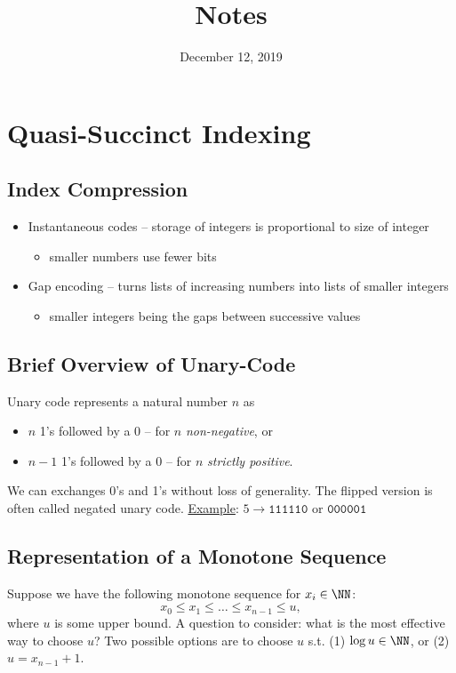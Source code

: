 \documentclass[10pt]{article}
\title{Notes}
\date{December 12, 2019}
\begin{document}
\maketitle

\section{Quasi-Succinct Indexing}\label{quasi-succinct-indexing}
\subsection{Index Compression}\label{index-compression}
\begin{itemize}
\item
    Instantaneous codes -- storage of integers is proportional to size of integer
    \begin{itemize}    
    \item
        smaller numbers use fewer bits
    \end{itemize}
\item
    Gap encoding -- turns lists of increasing numbers into lists of smaller integers
    \begin{itemize}
    \item
        smaller integers being the gaps between successive values
    \end{itemize}
\end{itemize}

\subsection{Brief Overview of Unary-Code}\label{unary-code}
Unary code represents a natural number \(n\) as
\begin{itemize}
\item
    \(n\) 1's followed by a 0 -- for \(n\) \textit{non-negative}, or
\item
    \(n - 1\) 1's followed by a 0 -- for \(n\) \textit{strictly positive}.
\end{itemize}
We can exchanges 0's and 1's without loss of generality.
The flipped version is often called negated unary code.
\underline{Example}: 
\( 5 \rightarrow \texttt{111110} \text{ or } \texttt{000001} \)

\subsection{Representation of a Monotone Sequence}\label{monotone-sequence}
Suppose we have the following monotone sequence for \(x_i \in \NN\):    
\[ x_0 \leq x_1 \leq \ldots \leq x_{n-1} \leq u, \]
where \(u\) is some upper bound. 
A question to consider: what is the most effective way to choose \(u\)?
Two possible options are to choose \(u\) s.t.
    (1) \(\log{u} \in \NN\), or
    (2) \(u = x_{n-1} + 1\).
\end{document}

